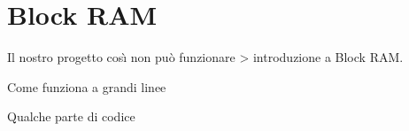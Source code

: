 \clearpage{\pagestyle{empty}\cleardoublepage}
\chapter{Block RAM}


Il nostro progetto cos\`{\i} non pu\`o funzionare > introduzione a Block RAM.

Come funziona a grandi linee

Qualche parte di codice

